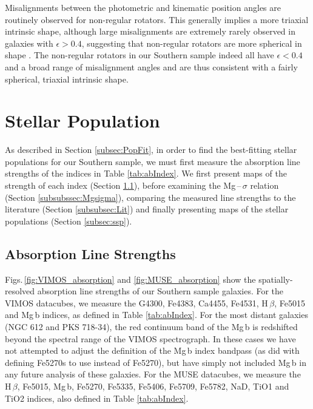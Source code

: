 			Misalignments between the photometric and kinematic position angles are routinely observed for non-regular rotators. This generally implies a more triaxial intrinsic shape, although large misalignments are extremely rarely observed in galaxies with $\epsilon > 0.4$, suggesting that non-regular rotators are more spherical in shape \citep{Cappellari2016}. The non-regular rotators in our Southern sample indeed all have $\epsilon < 0.4$ and a broad range of misalignment angles and are thus consistent with a fairly spherical, triaxial intrinsic shape.


\section{Stellar Population}
	\label{sec:pop}
	As described in Section \ref{subsec:PopFit}, in order to find the best-fitting stellar populations for our Southern sample, we must first measure the absorption line strengths of the indices in Table \ref{tab:abIndex}. We first present maps of the strength of each index (Section \ref{subsec:absorption}), before examining the Mg\,--\,$\sigma$ relation (Section \ref{subsubssec:Mgsigma}), comparing the measured line strengths to the literature (Section \ref{subsubsec:Lit}) and finally presenting maps of the stellar populations (Section \ref{subsec:ssp}).

	\subsection{Absorption Line Strengths}
		\label{subsec:absorption}

		Figs.\,\ref{fig:VIMOS_absorption} and \ref{fig:MUSE_absorption} show the spatially-resolved absorption line strengths of our Southern sample galaxies. For the VIMOS datacubes, we measure the G4300, Fe4383, Ca4455, Fe4531, H\,$\beta$, Fe5015 and Mg\,b indices, as defined in Table \ref{tab:abIndex}. For the most distant galaxies (NGC 612 and PKS 718-34), the red continuum band of the Mg\,b is redshifted beyond the spectral range of the VIMOS spectrograph. In these cases we have not attempted to adjust the definition of the Mg\,b index bandpass (as \citealt{Kuntschner2006} did with defining Fe5270s to use instead of Fe5270), but have simply not included Mg\,b in any future analysis of these galaxies. For the MUSE datacubes, we measure the H\,$\beta$, Fe5015, Mg\,b, Fe5270, Fe5335, Fe5406, Fe5709, Fe5782, NaD, TiO1 and TiO2 indices, also defined in Table \ref{tab:abIndex}.

